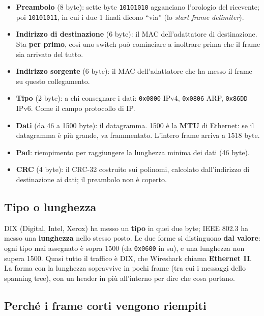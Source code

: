 \begin{itemize}
    \item \textbf{Preambolo} (8 byte): sette byte \texttt{10101010} agganciano l'orologio del ricevente; poi \texttt{10101011}, in cui i
          due 1 finali dicono ``via'' (lo \emph{start frame delimiter}).
    \item \textbf{Indirizzo di destinazione} (6 byte): il MAC dell'adattatore di destinazione. Sta \textbf{per primo}, così uno switch può
          cominciare a inoltrare prima che il frame sia arrivato del tutto.
    \item \textbf{Indirizzo sorgente} (6 byte): il MAC dell'adattatore che ha messo il frame su questo collegamento.
    \item \textbf{Tipo} (2 byte): a chi consegnare i dati: \texttt{0x0800} IPv4, \texttt{0x0806} ARP, \texttt{0x86DD} IPv6. Come il campo
          protocollo di IP.
    \item \textbf{Dati} (da 46 a 1500 byte): il datagramma. 1500 è la \textbf{MTU} di Ethernet: se il datagramma è più grande, va
          frammentato. L'intero frame arriva a 1518 byte.
    \item \textbf{Pad}: riempimento per raggiungere la lunghezza minima dei dati (46 byte).
    \item \textbf{CRC} (4 byte): il CRC-32 costruito sui polinomi, calcolato dall'indirizzo di destinazione ai dati; il preambolo non è
          coperto.
\end{itemize}

\subsection{Tipo o lunghezza}

DIX (Digital, Intel, Xerox) ha messo un \textbf{tipo} in quei due byte; IEEE 802.3 ha messo una \textbf{lunghezza} nello stesso posto.
Le due forme si distinguono \textbf{dal valore}: ogni tipo mai assegnato è sopra 1500 (da \texttt{0x0600} in su), e una lunghezza
non supera 1500. Quasi tutto il traffico è DIX, che Wireshark chiama \textbf{Ethernet II}. La forma con la lunghezza sopravvive in
pochi frame (tra cui i messaggi dello spanning tree), con un header in più all'interno per dire che cosa portano.

\subsection{Perché i frame corti vengono riempiti}


